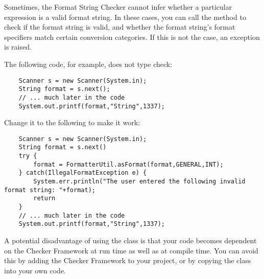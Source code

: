 
Sometimes, the Format String Checker cannot infer whether a particular
expression is a valid format string. In these cases, you can call the
method to check if the format string is valid, and whether the
format string's format specifiers match certain conversion categories.
If this is not the case, an exception is raised.

The following code, for example, does not type check:

\begin{Verbatim}
    Scanner s = new Scanner(System.in);    
    String format = s.next();
    // ... much later in the code
    System.out.printf(format,"String",1337); 
\end{Verbatim}

\noindent Change it to the following to make it work:

\begin{Verbatim}
    Scanner s = new Scanner(System.in);
    String format = s.next()
    try {
        format = FormatterUtil.asFormat(format,GENERAL,INT); 
    } catch(IllegalFormatException e) {
        System.err.println("The user entered the following invalid format string: "+format);
        return
    }
    // ... much later in the code
    System.out.printf(format,"String",1337); 
\end{Verbatim}

\noindent A potential disadvantage of using the  class is that your code becomes
dependent on the Checker Framework at run time as well as at compile time. You
can avoid this by adding the Checker Framework to your project, or by copying
the  class into your own code.
